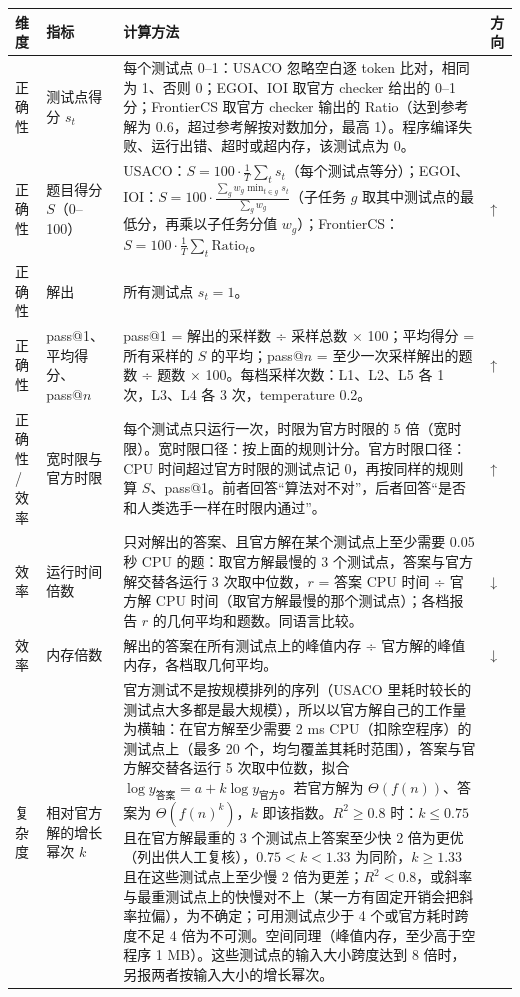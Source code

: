 \documentclass[11pt,a4paper,fontset=none]{ctexart}
\begin{document}
{\small\begin{longtable}{@{}p{1.6cm}p{2.6cm}p{9.9cm}p{1.2cm}@{}}
\toprule 维度 & 指标 & 计算方法 & 方向 \\ \midrule \endhead
正确性 & 测试点得分 $s_t$ & 每个测试点 0–1：USACO 忽略空白逐 token 比对，相同为 1、否则 0；EGOI、IOI 取官方 checker 给出的 0–1 分；FrontierCS 取官方 checker 输出的 Ratio（达到参考解为 0.6，超过参考解按对数加分，最高 1）。程序编译失败、运行出错、超时或超内存，该测试点为 0。 &  \\
正确性 & 题目得分 $S$（0–100） & USACO：$S = 100 \cdot \frac{1}{T}\sum_t s_t$（每个测试点等分）；EGOI、IOI：$S = 100 \cdot \frac{\sum_g w_g \min_{t \in g} s_t}{\sum_g w_g}$（子任务 $g$ 取其中测试点的最低分，再乘以子任务分值 $w_g$）；FrontierCS：$S = 100 \cdot \frac{1}{T}\sum_t \mathrm{Ratio}_t$。 & ↑ \\
正确性 & 解出 & 所有测试点 $s_t = 1$。 &  \\
正确性 & pass@1、平均得分、pass@$n$ & pass@1 = 解出的采样数 ÷ 采样总数 × 100；平均得分 = 所有采样的 $S$ 的平均；pass@$n$ = 至少一次采样解出的题数 ÷ 题数 × 100。每档采样次数：L1、L2、L5 各 1 次，L3、L4 各 3 次，temperature 0.2。 & ↑ \\
正确性 / 效率 & 宽时限与官方时限 & 每个测试点只运行一次，时限为官方时限的 5 倍（宽时限）。宽时限口径：按上面的规则计分。官方时限口径：CPU 时间超过官方时限的测试点记 0，再按同样的规则算 $S$、pass@1。前者回答“算法对不对”，后者回答“是否和人类选手一样在时限内通过”。 & ↑ \\
效率 & 运行时间倍数 & 只对解出的答案、且官方解在某个测试点上至少需要 0.05 秒 CPU 的题：取官方解最慢的 3 个测试点，答案与官方解交替各运行 3 次取中位数，$r$ = 答案 CPU 时间 ÷ 官方解 CPU 时间（取官方解最慢的那个测试点）；各档报告 $r$ 的几何平均和题数。同语言比较。 & ↓ \\
效率 & 内存倍数 & 解出的答案在所有测试点上的峰值内存 ÷ 官方解的峰值内存，各档取几何平均。 & ↓ \\
复杂度 & 相对官方解的增长幂次 $k$ & 官方测试不是按规模排列的序列（USACO 里耗时较长的测试点大多都是最大规模），所以以官方解自己的工作量为横轴：在官方解至少需要 2 ms CPU（扣除空程序）的测试点上（最多 20 个，均匀覆盖其耗时范围），答案与官方解交替各运行 5 次取中位数，拟合 $\log y_{\text{答案}} = a + k \log y_{\text{官方}}$。若官方解为 $\Theta(f(n))$、答案为 $\Theta(f(n)^k)$，$k$ 即该指数。$R^2 \ge 0.8$ 时：$k \le 0.75$ 且在官方解最重的 3 个测试点上答案至少快 2 倍为更优（列出供人工复核），$0.75 < k < 1.33$ 为同阶，$k \ge 1.33$ 且在这些测试点上至少慢 2 倍为更差；$R^2 < 0.8$，或斜率与最重测试点上的快慢对不上（某一方有固定开销会把斜率拉偏），为不确定；可用测试点少于 4 个或官方耗时跨度不足 4 倍为不可测。空间同理（峰值内存，至少高于空程序 1 MB）。这些测试点的输入大小跨度达到 8 倍时，另报两者按输入大小的增长幂次。 &  \\

\end{longtable}}
\end{document}
